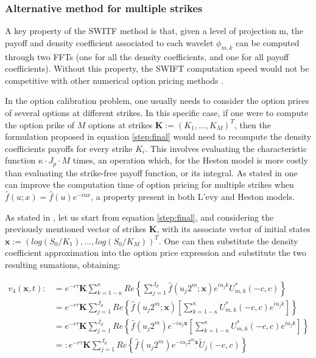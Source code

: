 \documentclass[12,twoside]{mammeTFM}
\theoremstyle{definition}
\theoremstyle{remark}
\begin{document}
\subsubsection{Alternative method for multiple strikes}\label{subsec:multiple_strikes}
A key property of the SWITF method is that, given a level of projection m, the payoff and density coefficient associated to each wavelet $\phi_{m,k}$ can be computed through two FFTs (one for all the density coefficients, and one for all payoff coefficients). Without this property, the SWIFT computation speed would not be competitive with other numerical option pricing methods \cite{flo20}.

In the option calibration problem, one usually needs to consider the option prices of several options at different strikes. In this specific case, if one were to compute the option prike of $M$ options at strikes $\boldsymbol{K} := (K_1, \ldots, K_M)^{T}$, then the formulation proposed in equation \ref{step:final} would need to recompute the density coefficients payoffs for every strike $K_i$. This involves evaluating the characteristic function $\kappa \cdot J_p \cdot M$ times, an operation which, for the Heston model is more costly than evaluating the strike-free payoff function, or its integral. As stated in \cite{mar17} one can improve the computation time of option pricing for multiple strikes when $\hat{f}(u; x) = \hat{f}(u) e^{-iux}$, a property present in both L'evy and Heston models.

As stated in \cite{mar17}, let us start from equation \ref{step:final}, and considering the previously mentioned vector of strikes $\boldsymbol{K}$, with its associate vector of initial states $\boldsymbol{x} := (log(S_0/K_1), \ldots, log(S_0/K_M))^{T}$. One can then substitute the density coefficient approximation into the option price expression and substitute the two resulting sumations, obtaining:

\begin{align}
v_4(\boldsymbol{x}, t) :&=  e^{-r\tau} \boldsymbol{K} \sum_{k = 1 - \kappa}^{\kappa} Re \left\{ \sum_{j=1}^{J_d} \hat{f}(u_j 2^m; \boldsymbol{x}) e^{i u_j k} U_{m,k}^{*}(-c,c) \right\} \\
& =e^{-r\tau}\boldsymbol{K} \sum_{j=1}^{J_d} Re \left\{ \hat{f}(u_j 2^m;\boldsymbol{x}) \left[ \sum_{k = 1-\kappa}^{\kappa} U_{m,k}^{*}(-c,c) e^{i u_j k} \right] \right\} \\
&= e^{-r\tau}\boldsymbol{K} \sum_{j=1}^{J_d} Re \left\{ \hat{f}(u_j 2^m) e^{-i u_j \boldsymbol{x}} \left[ \sum_{k = 1-\kappa}^{\kappa} U_{m,k}^{*}(-c,c) e^{i u_j k} \right] \right\} \\
\label{step:alternative_final}
&=: e^{-r\tau}\boldsymbol{K} \sum_{j=1}^{J_d} Re \left\{ \hat{f}(u_j 2^m) e^{-i u_j 2^m \boldsymbol{x}} \tilde{U}_j(-c,c) \right\}
\end{align}
\end{document}
